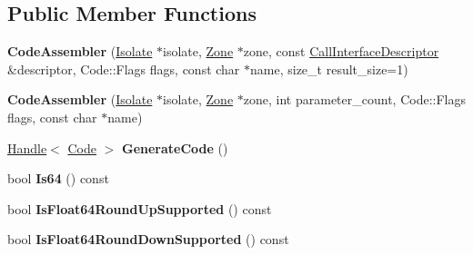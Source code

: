 \subsection*{Public Member Functions}
\begin{DoxyCompactItemize}
\item 
{\bfseries Code\+Assembler} (\hyperlink{classv8_1_1internal_1_1_isolate}{Isolate} $\ast$isolate, \hyperlink{classv8_1_1internal_1_1_zone}{Zone} $\ast$zone, const \hyperlink{classv8_1_1internal_1_1_call_interface_descriptor}{Call\+Interface\+Descriptor} \&descriptor, Code\+::\+Flags flags, const char $\ast$name, size\+\_\+t result\+\_\+size=1)\hypertarget{classv8_1_1internal_1_1compiler_1_1_code_assembler_afc8f07d4e06444b92cfb670e9686c9fd}{}\label{classv8_1_1internal_1_1compiler_1_1_code_assembler_afc8f07d4e06444b92cfb670e9686c9fd}

\item 
{\bfseries Code\+Assembler} (\hyperlink{classv8_1_1internal_1_1_isolate}{Isolate} $\ast$isolate, \hyperlink{classv8_1_1internal_1_1_zone}{Zone} $\ast$zone, int parameter\+\_\+count, Code\+::\+Flags flags, const char $\ast$name)\hypertarget{classv8_1_1internal_1_1compiler_1_1_code_assembler_a5a3d3a1fa12d5cefd7fda05d68021bb9}{}\label{classv8_1_1internal_1_1compiler_1_1_code_assembler_a5a3d3a1fa12d5cefd7fda05d68021bb9}

\item 
\hyperlink{classv8_1_1internal_1_1_handle}{Handle}$<$ \hyperlink{classv8_1_1internal_1_1_code}{Code} $>$ {\bfseries Generate\+Code} ()\hypertarget{classv8_1_1internal_1_1compiler_1_1_code_assembler_ab3c25bb9c7f34b6aedee38208fa8f037}{}\label{classv8_1_1internal_1_1compiler_1_1_code_assembler_ab3c25bb9c7f34b6aedee38208fa8f037}

\item 
bool {\bfseries Is64} () const \hypertarget{classv8_1_1internal_1_1compiler_1_1_code_assembler_a8407ae2a22f00c5216635c30d8c09015}{}\label{classv8_1_1internal_1_1compiler_1_1_code_assembler_a8407ae2a22f00c5216635c30d8c09015}

\item 
bool {\bfseries Is\+Float64\+Round\+Up\+Supported} () const \hypertarget{classv8_1_1internal_1_1compiler_1_1_code_assembler_a5079fbd91270c6b4c94b70979c75b23f}{}\label{classv8_1_1internal_1_1compiler_1_1_code_assembler_a5079fbd91270c6b4c94b70979c75b23f}

\item 
bool {\bfseries Is\+Float64\+Round\+Down\+Supported} () const \hypertarget{classv8_1_1internal_1_1compiler_1_1_code_assembler_a99c4d74489491de1edf70bb214fc1c38}{}\label{classv8_1_1internal_1_1compiler_1_1_code_assembler_a99c4d74489491de1edf70bb214fc1c38}


\end{DoxyCompactItemize}
